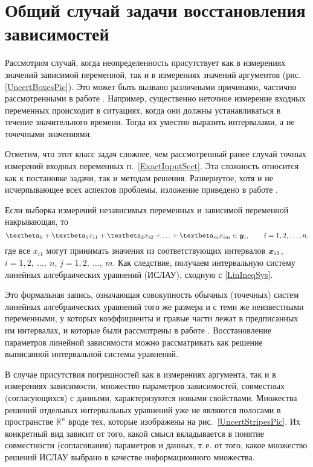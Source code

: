 \documentclass[a5paper,openany]{book}
\newcommand{\mbf}[1]{\protect\text{\boldmath$#1$}}
\newcommand{\mbb}{\mathbb}
\renewcommand{\beta}{\text{\textbeta}}
\begin{document}
\section[Общий случай задачи восстановления зависимостей]%
{Общий случай задачи восстановления зависимостей} 
\label{GenIDataFitSect} 


Рассмотрим  случай, когда неопределенность присутствует как в измерениях 
значений зависимой переменной, так и в измерениях значений аргументов 
(рис.~ \ref{UncertBoxesPic}). Это может быть вызвано различными причинами, частично рассмотренными в работе \cite{SPbSTU2021}. 
Например, существенно неточное измерение входных переменных происходит 
в ситуациях, когда они должны устанавливаться в течение значительного времени.
Тогда их уместно выразить интервалами, а не точечными значениями. 

Отметим, что этот класс задач сложнее, чем рассмотренный ранее случай точных измерений входных переменных п.~\ref{ExactInputSect}. Эта сложность 
относится как к постановке задачи, так и методам решения. Развернутое, хотя и не исчерпывающее всех аспектов проблемы, изложение приведено в работе \cite{MetodikaBook}.  

Если выборка измерений независимых переменных и зависимой переменной накрывающая, то  
\begin{equation*} 
	\beta_0 + \beta_1 x_{i1} + \beta_2 x_{i2} + \ldots + \beta_m x_{im} \in\mbf{y}_{i}, 
	\qquad  i = 1,2,\ldots,n, 
\end{equation*} 
где все $x_{i1}$ могут принимать значения из соответствующих интервалов $\mbf{x}_{i1}$, 
$i = 1,2, \ \ldots, \ n$, $j = 1,2, \ \ldots, \ m$. Как следствие, получаем интервальную систему 
линейных алгебраических уравнений (ИСЛАУ), сходную с \eqref{LinIneqSys}.

Это формальная запись, означающая совокупность обычных (точечных) систем линейных 
алгебраических уравнений того же размера и с теми же неизвестными переменными, 
у которых коэффициенты и правые части лежат в предписанных им интервалах, и которые были рассмотрены в
работе \cite{SSharyBook}. Восстановление параметров линейной зависимости можно 
рассматривать как решение выписанной интервальной системы 
уравнений. 

В случае присутствия погрешностей как в измерениях аргумента, так и в измерениях 
зависимости, множество параметров зависимостей, совместных (согласующихся) с данными, 
характеризуются новыми свойствами. Множества решений отдельных интервальных уравнений 
уже не являются полосами в пространстве $\mbb{R}^n$ вроде тех, которые изображены 
на рис.~\ref{UncertStripesPic}. Их конкретный вид 
зависит от того, какой смысл вкладывается в понятие совместности (согласования) 
параметров и данных, т.\,е. от того, какое множество решений ИСЛАУ выбрано в качестве 
информационного множества. 
\end{document}
